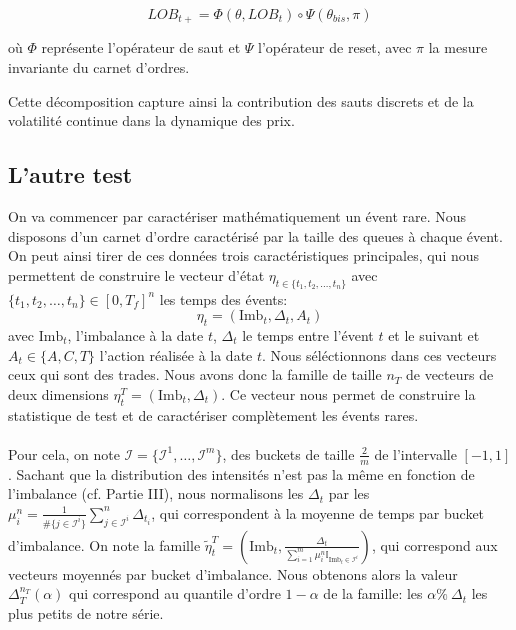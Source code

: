 \documentclass[12pt,a4paper]{article}
\theoremstyle{definition}
\theoremstyle{remark}
\begin{document}
\begin{equation}
LOB_{t+} = \Phi(\theta, LOB_t) \circ \Psi(\theta_{bis}, \pi)
\end{equation}

où $\Phi$ représente l'opérateur de saut et $\Psi$ l'opérateur de reset, avec $\pi$ la mesure invariante du carnet d'ordres.



Cette décomposition capture ainsi la contribution des sauts discrets et de la volatilité continue dans la dynamique des prix.




\subsection{L'autre test}

On va commencer par caractériser mathématiquement un évent rare. Nous disposons d'un carnet d'ordre caractérisé par la taille des queues à chaque évent. On peut ainsi tirer de ces données trois caractéristiques principales, qui nous permettent de construire le vecteur d'état $\eta_{t\in \{t_1,t_2,\dots,t_n\}}$ avec $\{t_1,t_2,\dots,t_n\}\in [0,T_f]^n$ les temps des évents:
$$\eta_t = (\text{Imb}_t, \Delta_t, {A_t})$$
avec $\text{Imb}_t$, l'imbalance à la date $t$, $\Delta_t$ le temps entre l'évent $t$ et le suivant et $A_t\in \{A,C,T\}$ l'action réalisée à la date $t$. Nous séléctionnons dans ces vecteurs ceux qui sont des trades. Nous avons donc la famille de taille $n_T$ de vecteurs de deux dimensions $\eta_t^T = (\text{Imb}_t, \Delta_t)$.
Ce vecteur nous permet de construire la statistique de test et de caractériser complètement les évents rares.
\\
\\
Pour cela, on note $\mathcal I= \{\mathcal I^1,\dots,\mathcal I^m\}$, des buckets de taille $\frac{2}{m}$ de l'intervalle $[-1,1]$. Sachant que la distribution des intensités n'est pas la même en fonction de l'imbalance (cf. Partie III), nous normalisons les $\Delta_t$ par les $\mu_i^n = \frac{1}{\#\{j\in \mathcal I^i\}}\sum_{j\in \mathcal I^i}^n\Delta_{t_i}$, qui correspondent à la moyenne de temps par bucket d'imbalance.
On note la famille $\tilde \eta_t^T = \left(\text{Imb}_t, \frac{\Delta_t}{\sum_{i=1}^m\mu_i^n\mathbb{I}_{\text{Imb}_t\in\mathcal{I}^{i}}}\right)$, qui correspond aux vecteurs moyennés par bucket d'imbalance.
Nous obtenons alors la valeur $\Delta_T^{n_T}(\alpha)$ qui correspond au quantile d'ordre $1-\alpha$ de la famille: les $\alpha\% \ \Delta_t$ les plus petits de notre série.
\end{document}
